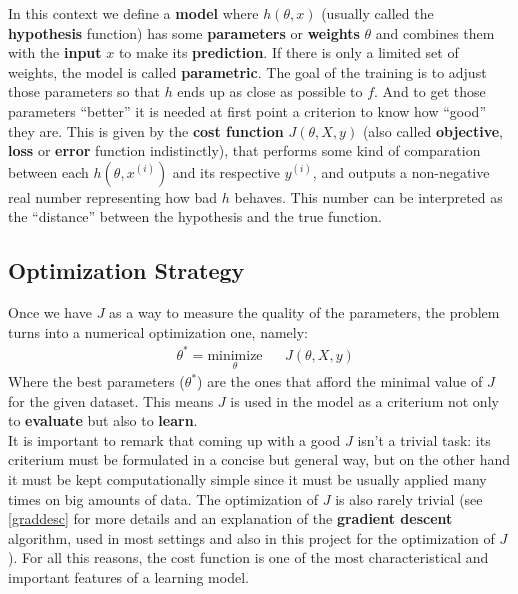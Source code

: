 In this context we define a \textbf{model} where \(h(\theta, x)\) (usually called the \textbf{hypothesis} function) has some \textbf{parameters} or \textbf{weights} \(\theta\) and combines them with the \textbf{input} \(x\) to make its \textbf{prediction}. If there is only a limited set of weights, the model is called \textbf{parametric}. The goal of the training is to adjust those parameters so that \(h\) ends up as close as possible to \(f\). And to get those parameters ``better'' it is needed at first point a criterion to know how ``good'' they are. This is given by the \textbf{cost function} \(J(\theta, X, y)\) (also called \textbf{objective}, \textbf{loss} or \textbf{error} function indistinctly), that performs some kind of comparation between each \(h(\theta, x^{(i)})\) and its respective \(y^{(i)}\), and outputs a non-negative real number representing how bad \(h\) behaves. This number can be interpreted as the ``distance'' between the hypothesis and the true function.


\subsection{Optimization Strategy}

Once we have \(J\) as a way to measure the quality of the parameters, the problem turns into a numerical optimization one, namely:
\begin{equation*}
  \begin{aligned}
    & \theta^* = \underset{\theta}{\text{minimize}}
    & & J(\theta, X, y)
  \end{aligned}
\end{equation*}
Where the best parameters (\(\theta^*\)) are the ones that afford the minimal value of \(J\) for the given dataset. This means \(J\) is used in the model as a criterium not only to \textbf{evaluate} but also to \textbf{learn}.\\

It is important to remark that coming up with a good \(J\) isn't a trivial task: its criterium must be formulated in a concise but general way, but on the other hand it must be kept computationally simple since it must be usually applied many times on big amounts of data. The optimization of \(J\) is also rarely trivial (see \ref{graddesc} for more details and an explanation of the \textbf{gradient descent} algorithm, used in most settings and also in this project for the optimization of \(J\)). For all this reasons, the cost function is one of the most characteristical and important features of a learning model.\\

